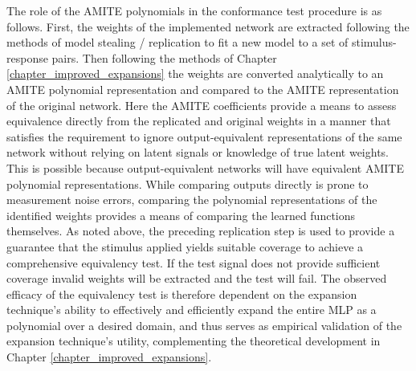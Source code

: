 The role of the AMITE polynomials in the conformance test procedure
is as follows. First, the weights of the implemented network are extracted
following the methods of model stealing / replication
\cite{tramer_stealing_2016,papernot_practical_2017,oh_reverse_2019,duddu_stealing_2018,orekondy_knockoff_2019} to fit a new model
to a set of stimulus-response pairs.  Then following the
methods of Chapter \ref{chapter_improved_expansions}
the weights are converted analytically to an AMITE polynomial
representation and compared to the AMITE
representation of the original network. Here the AMITE
coefficients provide a means to assess equivalence directly
from the replicated and original weights in a manner that satisfies the requirement
to ignore output-equivalent representations of the same network
without relying on latent signals or knowledge of true latent weights.
This is possible because output-equivalent networks will have equivalent AMITE polynomial
representations. While comparing outputs directly is prone to measurement noise
errors, comparing the polynomial representations of the identified weights
provides a means of comparing the learned functions themselves.
As noted above, the preceding replication
step is used to provide a guarantee that the stimulus applied
yields suitable coverage to achieve a comprehensive equivalency
test. If the test signal does not provide sufficient coverage
invalid weights will be extracted and the test will fail.
The observed efficacy of the equivalency test is therefore dependent on the
expansion technique's ability to effectively and efficiently
expand the entire MLP as a polynomial over a desired domain,
and thus serves as empirical validation of the expansion
technique's utility, complementing the theoretical
development in Chapter \ref{chapter_improved_expansions}.

